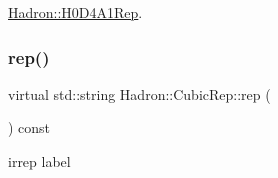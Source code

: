 \mbox{\hyperlink{structHadron_1_1H0D4A1Rep_abc2f3e6961a83aec1fdfa3909b4925dd}{Hadron\+::\+H0\+D4\+A1\+Rep}}.

\mbox{\label{structHadron_1_1CubicRep_ac3eb63608803d44c68681f158e14eb1b}} 
\subsubsection{\texorpdfstring{rep()}{rep()}\hspace{0.1cm}{\footnotesize\ttfamily [1/2]}}
{\footnotesize\ttfamily virtual std\+::string Hadron\+::\+Cubic\+Rep\+::rep (\begin{DoxyParamCaption}{ }\end{DoxyParamCaption}) const\hspace{0.3cm}{\ttfamily [pure virtual]}}

irrep label 

